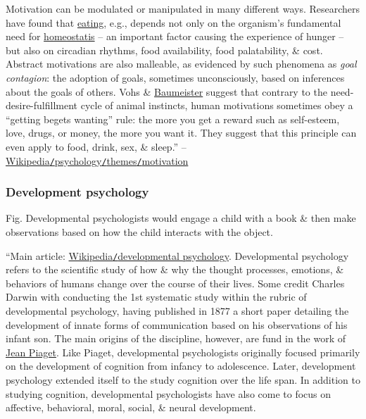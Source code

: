 \documentclass[oneside]{book}
\numberwithin{equation}{section}
\begin{document}
Motivation can be modulated or manipulated in many different ways. Researchers have found that \href{https://en.wikipedia.org/wiki/Eating}{eating}, e.g., depends not only on the organism's fundamental need for \href{https://en.wikipedia.org/wiki/Homeostasis}{homeostatis} -- an important factor causing the experience of hunger -- but also on circadian rhythms, food availability, food palatability, \& cost. Abstract motivations are also malleable, as evidenced by such phenomena as \textit{goal contagion}: the adoption of goals, sometimes unconsciously, based on inferences about the goals of others. Vohs \& \href{https://en.wikipedia.org/wiki/Roy_Baumeister}{Baumeister} suggest that contrary to the need-desire-fulfillment cycle of animal instincts, human motivations sometimes obey a ``getting begets wanting'' rule: the more you get a reward such as self-esteem, love, drugs, or money, the more you want it. They suggest that this principle can even apply to food, drink, sex, \& sleep.'' -- \href{https://en.wikipedia.org/wiki/Psychology#Motivation}{Wikipedia\texttt{/}psychology\texttt{/}themes\texttt{/}motivation}

\subsubsection{Development psychology}
\textsf{Fig. Developmental psychologists would engage a child with a book \& then make observations based on how the child interacts with the object.}

``Main article: \href{https://en.wikipedia.org/wiki/Developmental_psychology}{Wikipedia\texttt{/}developmental psychology}. Developmental psychology refers to the scientific study of how \& why the thought processes, emotions, \& behaviors of humans change over the course of their lives. Some credit Charles Darwin with conducting the 1st systematic study within the rubric of developmental psychology, having published in 1877 a short paper detailing the development of innate forms of communication based on his observations of his infant son. The main origins of the discipline, however, are fund in the work of \href{https://en.wikipedia.org/wiki/Jean_Piaget}{Jean Piaget}. Like Piaget, developmental psychologists originally focused primarily on the development of cognition from infancy to adolescence. Later, development psychology extended itself to the study cognition over the life span. In addition to studying cognition, developmental psychologists have also come to focus on affective, behavioral, moral, social, \& neural development.
\end{document}
